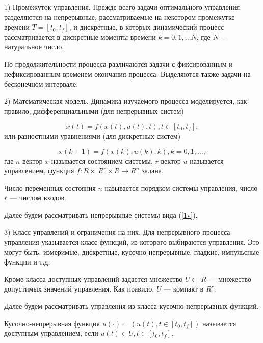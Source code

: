 1) Промежуток управления. Прежде всего задачи оптимального управления разделяются на непрерывные, рассматриваемые на некотором промежутке времени $T = [t_{0},t_{f}]$, и дискретные, в которых динамический процесс рассматривается в дискретные моменты времени $k = 0,1,...N$, где $N$ — натуральное число.

По продолжительности процесса различаются задачи с фиксированным и нефиксированным временем окончания процесса. Выделяются также задачи на бесконечном интервале.

2) Математическая модель. Динамика изучаемого процесса моделируется, как правило, дифференциальными (для непрерывных систем)

\begin{equation}\label{1v}\dot{x}(t) = f(x(t),u(t),t), t \in [t_0,t_f],\end{equation}
или разностными уравнениями (для дискретных систем)

$$x(k + 1) = f(x(k),u(k),k),k = 0,1,...,$$
где $n$-вектор $x$ называется состоянием системы, $r$-вектор $u$ называется
управлением, функция 
$ f : R \times\ R^r \times R \rightarrow R^n$ задана.

Число переменных состояния $n$ называется порядком системы управления, число $r$ — числом входов.

Далее будем рассматривать непрерывные системы вида (\ref{1v}).

3) Класс управлений и ограничения на них. Для непрерывного процесса управления указывается класс функций, из которого выбираются управления. Это могут быть: измеримые, дискретные, кусочно-непрерывные, гладкие, импульсные функции и т.д.

Кроме класса доступных управлений задается множество 
$U \subset\ R$ — множество допустимых значений управления. Как правило, $U$ — компакт в $R^r$.

Далее будем рассматривать управления из класса кусочно-непрерывных функций.

\begin{definition}Кусочно-непрерывная функция $u(\cdot) = (u(t),t \in [t_{0},t_{f}])$ называется доступным управлением, если $u(t) \in U, t \in [t_{0},t_{f}].$
\end{definition}

